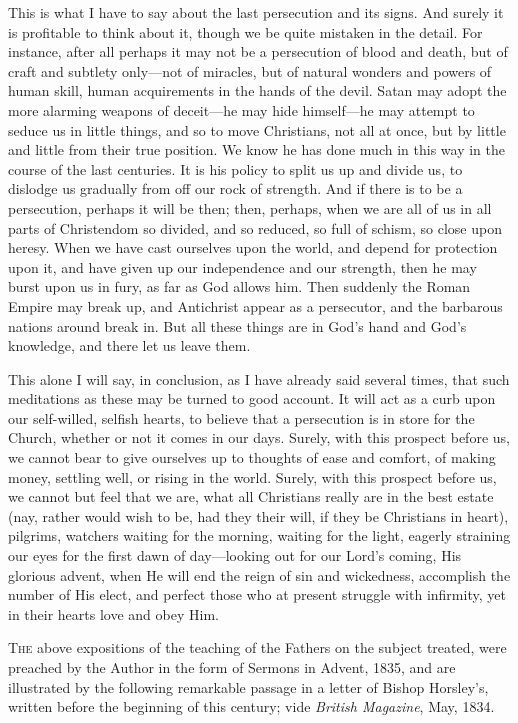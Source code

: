 This is what I have to say about the last persecution and its
signs. And surely it is profitable to think about it, though we be
quite mistaken in the detail. For instance, after all perhaps it may
not be a persecution of blood and death, but of craft and subtlety
only—not of miracles, but of natural wonders and powers of human
skill, human acquirements in the hands of the devil. Satan may adopt
the more alarming weapons of deceit—he may hide himself—he may
attempt to seduce us in little things, and so to move Christians, not
all at once, but by little and little from their true position. We
know he has done much in this way in the course of the last centuries.
It is his policy to split us up and divide us, to dislodge us
gradually from off our rock of strength. And if there is to be a
persecution, perhaps it will be then; then, perhaps, when we are all
of us in all parts of Christendom so divided, and so reduced, so full
of schism, so close upon heresy. When we have cast ourselves upon the
world, and depend for protection upon it, and have given up our
independence and our strength, then he may burst upon us in fury, as
far as God allows him. Then suddenly the Roman Empire may break up,
and Antichrist appear as a persecutor, and the barbarous nations
around break in. But all these things are in God's hand and God's
knowledge, and there let us leave them.

This alone I will say, in conclusion, as I have already said
several times, that such meditations as these may be turned to good
account. It will act as a curb upon our self-willed, selfish hearts,
to believe that a persecution is in store for the Church, whether or
not it comes in our days. Surely, with this prospect before us, we
cannot bear to give ourselves up to thoughts of ease and comfort, of
making money, settling well, or rising in the world. Surely, with this
prospect before us, we cannot but feel that we are, what all
Christians really are in the best estate (nay, rather would wish to
be, had they their will, if they be Christians in heart), pilgrims,
watchers waiting for the morning, waiting for the light, eagerly
straining our eyes for the first dawn of day—looking out for our
Lord's coming, His glorious advent, when He will end the reign of sin
and wickedness, accomplish the number of His elect, and perfect those
who at present struggle with infirmity, yet in their hearts love and
obey Him.


T\textsc{he} above expositions of the teaching of the Fathers on the subject
treated, were preached by the Author in the form of Sermons in Advent,
1835, and are illustrated by the following remarkable passage in a
letter of Bishop Horsley's, written before the beginning of this
century; vide \emph{British Magazine}, May, 1834.

